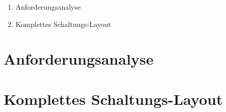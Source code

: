 
\addchap{\langanhang}

{\Large
\begin{enumerate}[label=\Alph*.]
	\item Anforderungsanalyse
	\item Komplettes Schaltungs-Layout
\end{enumerate}
}
\pagebreak

\section*{Anforderungsanalyse}\label{sec:Anforderungsanalyse}

\pagebreak
\section*{Komplettes Schaltungs-Layout}\label{sec:Schaltungs-Layout_komplett}

\pagebreak

